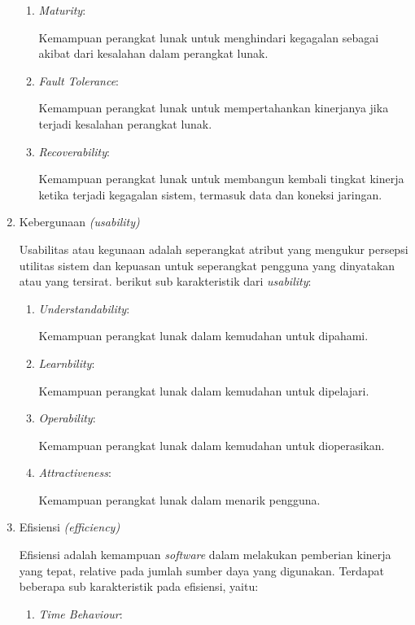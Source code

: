 \begin{enumerate}
	\begin{enumerate}[label=\alph*)]
    \item \textit{Maturity}:
    
		Kemampuan perangkat lunak untuk menghindari kegagalan sebagai
		akibat dari kesalahan dalam perangkat lunak.
    \item \textit{Fault Tolerance}:
    
		Kemampuan perangkat lunak untuk mempertahankan kinerjanya jika
		terjadi kesalahan perangkat lunak.
    \item \textit{Recoverability}:
    
		Kemampuan perangkat lunak untuk membangun kembali tingkat kinerja
		ketika terjadi kegagalan sistem, termasuk data dan koneksi jaringan. 

	\end{enumerate}

	\item Kebergunaan \textit{(usability)}
	
	Usabilitas atau kegunaan adalah seperangkat atribut yang mengukur persepsi utilitas sistem dan kepuasan untuk seperangkat pengguna yang dinyatakan atau yang tersirat. berikut sub karakteristik dari \textit{usability}:

	\begin{enumerate}[label=\alph*)]
    \item \textit{Understandability}:
    
		Kemampuan perangkat lunak dalam kemudahan untuk dipahami.
    \item \textit{Learnbility}:
    
		Kemampuan perangkat lunak dalam kemudahan untuk dipelajari.
    \item \textit{Operability}:
    
		Kemampuan perangkat lunak dalam kemudahan untuk dioperasikan.
    \item \textit{Attractiveness}:
    
		Kemampuan perangkat lunak dalam menarik pengguna. 
	\end{enumerate}

	\item Efisiensi \textit{(efficiency)}
	
	Efisiensi adalah kemampuan \textit{software} dalam melakukan pemberian kinerja yang tepat, relative pada jumlah sumber daya yang digunakan. Terdapat beberapa sub karakteristik pada efisiensi, yaitu:

	\begin{enumerate}[label=\alph*)]
    \item \textit{Time Behaviour}:
    

\end{enumerate}
\end{enumerate}
